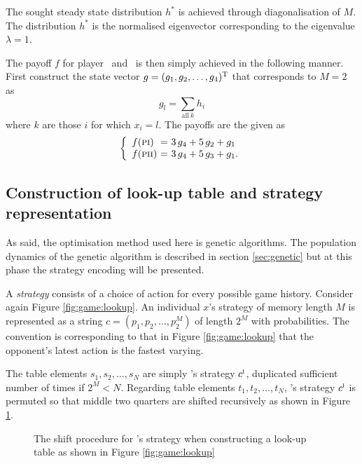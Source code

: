 The sought steady state distribution $h^\ast$ is achieved through diagonalisation of $M$. The distribution $h^\ast$ is the normalised eigenvector corresponding to the eigenvalue $\lambda = 1$.

The payoff $f$ for player \pone\ and \ptwo\ is then simply achieved in the following manner. First construct the state vector $g = (g_1, g_2, \dots, g_4)^{\mathrm{T}}$ that corresponds to $M = 2$ %
as
\begin{displaymath}
g_l = \sum_{\mathrm{all~} k } h_i
\end{displaymath}
where $k$ are those $i$ for which $x_i = l$. The payoffs are the given as
\begin{equation}
\left\{
\begin{array}{l@{~=~}l}
f(\pone) & 3\, g_4 + 5\, g_2 + g_1 \\[.5\baselineskip]
f(\ptwo) & 3\, g_4 + 5\, g_3 + g_1.
\end{array}
\right.
\label{equ:game:payoff}
\end{equation}

\subsection{Construction of look-up table and strategy representation} %
As said, the optimisation method used here is genetic algorithms. The population dynamics of the genetic algorithm is described in section \ref{sec:genetic} but at this phase the strategy encoding will be presented.

A \textit{strategy} consists of a choice of action for every possible game history. Consider again Figure \ref{fig:game:lookup}. An individual $x$'s strategy of memory length $M$ is represented as a string $c = (p_1, p_2, \dots, p_2^M)$ of length $2^M$ with probabilities. The convention is corresponding to that in Figure \ref{fig:game:lookup} that the opponent's latest action is the fastest varying.

The table elements $s_1, s_2, \dots, s_N$ are simply \pone's strategy $c^{\textsc{i}}$, duplicated sufficient number of times if $2^M < N$. Regarding table elements $t_1, t_2, \dots, t_N$, \ptwo's strategy $c^{\textsc{i}}$ is permuted so that middle two quarters are shifted recursively as shown in Figure \ref{fig:game:shift}.

\begin{figure}[!htbp]\centering \footnotesize

\caption{The shift procedure for \ptwo's strategy when constructing a look-up table as shown in Figure \ref{fig:game:lookup}}
\label{fig:game:shift}
\end{figure}

